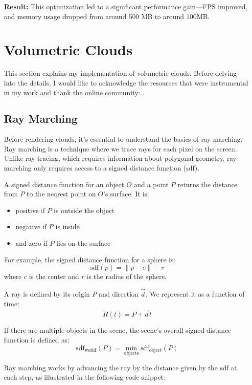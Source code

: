 \textbf{Result:} This optimization led to a significant performance gain—FPS improved, and memory usage dropped from around 500 MB to around 100MB.


\section{Volumetric Clouds}
This section explains my implementation of volumetric clouds. Before delving into the details, I would like to acknowledge the resources that were instrumental in my work and thank the online community: \cite{sebestianlague2019} \cite{shadertoy2013} \cite{guerrillagames2025nubis} \cite{reinder2018} \cite{fredrik} \cite{gamedevnet2015horizonzerodawn} \cite{palenik2016volumetricclouds} \cite{maxime2023} \cite{engel2016gpupro7}.
\subsection{Ray Marching}

Before rendering clouds, it's essential to understand the basics of ray marching. Ray marching is a technique where we trace rays for each pixel on the screen. Unlike ray tracing, which requires information about polygonal geometry, ray marching only requires access to a signed distance function ($\text{sdf}$). 

A signed distance function for an object $O$ and a point $P$ returns the distance from $P$ to the nearest point on $O$'s surface. It is:
\begin{itemize}
\item{positive if $P$ is outside the object}
\item{negative if $P$ is inside}
\item{and zero if $P$ lies on the surface}
\end{itemize}

For example, the signed distance function for a sphere is:
\[
\text{sdf}(p) = \|p - c\| - r
\]
where $c$ is the center and $r$ is the radius of the sphere.

A ray is defined by its origin $P$ and direction $\vec{d}$. We represent it as a function of time:
\[
R(t) = P + \vec{d}t
\]

If there are multiple objects in the scene, the scene’s overall signed distance function is defined as:
\[
\text{sdf}_{\text{world}}(P) = \min_{\text{objects}} \text{sdf}_{\text{object}}(P)
\]

Ray marching works by advancing the ray by the distance given by the $\text{sdf}$ at each step, as illustrated in the following code snippet:

